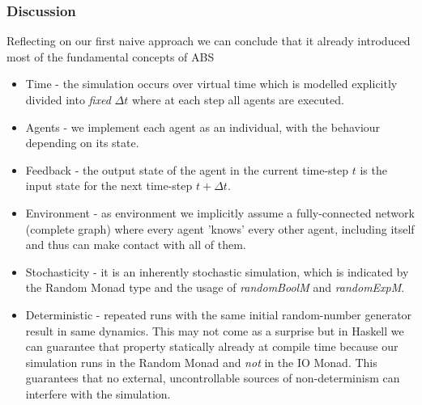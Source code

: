 %    	

\subsubsection{Discussion}
Reflecting on our first naive approach we can conclude that it already introduced most of the fundamental concepts of ABS
\begin{itemize}
	\item Time - the simulation occurs over virtual time which is modelled explicitly divided into \textit{fixed} $\Delta t$ where at each step all agents are executed.
	\item Agents - we implement each agent as an individual, with the behaviour depending on its state.
	\item Feedback - the output state of the agent in the current time-step $t$ is the input state for the next time-step $t + \Delta t$.
	\item Environment - as environment we implicitly assume a fully-connected network (complete graph) where every agent 'knows' every other agent, including itself and thus can make contact with all of them.
	\item Stochasticity - it is an inherently stochastic simulation, which is indicated by the Random Monad type and the usage of \textit{randomBoolM} and \textit{randomExpM}.
	\item Deterministic - repeated runs with the same initial random-number generator result in same dynamics. This may not come as a surprise but in Haskell we can guarantee that property statically already at compile time because our simulation runs in the Random Monad and \textit{not} in the IO Monad. This guarantees that no external, uncontrollable sources of non-determinism can interfere with the simulation.
\end{itemize}

